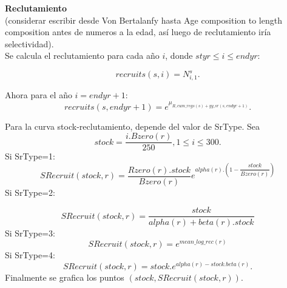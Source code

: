 \documentclass{article}
\begin{document}
\textbf{Reclutamiento}\\
(considerar escribir desde Von Bertalanfy hasta Age composition to length composition antes de numeros a la edad, así luego de reclutamiento iría selectividad).\\

Se calcula el reclutamiento para cada año $i$, donde $styr\leq i \leq endyr$:

\begin{equation}
    recruits(s,i)=N^s_{i,1}.
\end{equation}

Ahora para el año $i=endyr+1$:
\begin{equation}
    recruits(s,endyr+1)=e^{\mu_{R,cum\_regs(s)+yy\_sr(s,endyr+1)}}.
\end{equation}

Para la curva stock-reclutamiento, depende del valor de SrType. Sea 
\begin{equation}
    stock=\dfrac{i.Bzero(r)}{250}, 1\leq i \leq 300.
\end{equation}
Si SrType=1:
\begin{equation}
SRecruit(stock,r)=\dfrac{Rzero(r).stock}{Bzero(r)}e^{alpha(r).\left(1-\dfrac{stock}{Bzero(r)}\right)}
\end{equation}
Si SrType=2:

\begin{equation}
SRecruit(stock,r)=\dfrac{stock}{alpha(r)+beta(r).stock}
        \end{equation}
Si SrType=3:
\begin{equation}
SRecruit(stock,r)=e^{mean\_log\_rec(r)}
\end{equation}
Si SrType=4:
\begin{equation}
SRecruit(stock,r) =  stock.e^{alpha(r)-stock.beta(r)}.
\end{equation}
Finalmente se grafica los puntos $(stock, SRecruit(stock,r))$.








\end{document}
